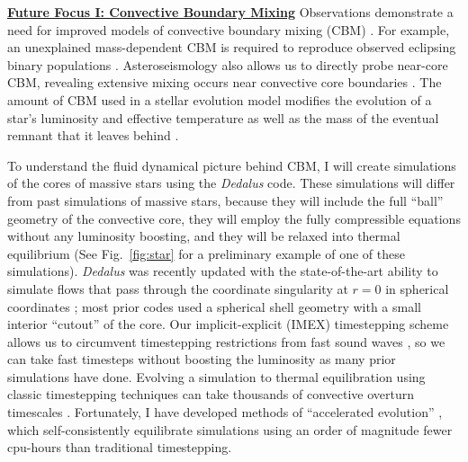 \documentclass[12pt]{article}
\newcommand{\sct}[1]{\vspace{0.3cm}\hspace{-\parindent}\textbf{\underline{#1}}\hspace{0.3cm}}
\begin{document}
\vspace{0.1cm}
\sct{Future Focus I: Convective Boundary Mixing}
Observations demonstrate a need for improved models of convective boundary mixing (CBM) \citep{johnston2021}.
For example, an unexplained mass-dependent CBM is required to reproduce observed eclipsing binary populations  \citep{claret_torres_2019}.
Asteroseismology also allows us to directly probe near-core CBM, revealing extensive mixing occurs near convective core boundaries \citep{michielsen_etal_2019, pedersen_etal_2021}.
The amount of CBM used in a stellar evolution model modifies the evolution of a star's luminosity and effective temperature as well as the mass of the eventual remnant that it leaves behind \citep{castro_etal_2014,higgins_vink_2019}.


To understand the fluid dynamical picture behind CBM, I will create simulations of the cores of massive stars using the \emph{Dedalus} \citep{burns_etal_2020} code.
These simulations will differ from past simulations of massive stars, because they will include the full ``ball'' geometry of the convective core, they will employ the fully compressible equations without any luminosity boosting, and they will be relaxed into thermal equilibrium (See Fig.~\ref{fig:star} for a preliminary example of one of these simulations).
\emph{Dedalus} was recently updated with the state-of-the-art ability to simulate flows that pass through the coordinate singularity at $r = 0$ in spherical coordinates \citep{vasil_etal_2019,lecoanet_etal_2019}; most prior codes used a spherical shell geometry with a small interior ``cutout'' of the core.
Our implicit-explicit (IMEX) timestepping scheme allows us to circumvent timestepping restrictions from fast sound waves \citep{anders_brown_2017}, so we can take fast timesteps without boosting the luminosity as many prior simulations have done.
Evolving a simulation to thermal equilibration using classic timestepping techniques can take thousands of convective overturn timescales \citep{anders_etal_2022a,anders_etal_2022b}.
Fortunately, I have developed methods of ``accelerated evolution'' \citep{anders_etal_2018}, which self-consistently equilibrate simulations using an order of magnitude fewer cpu-hours than traditional timestepping.
\end{document}
